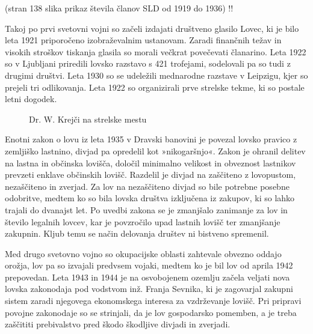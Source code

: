 \documentclass[a4paper,12pt,openright]{book}
\begin{document}
(stran 138 slika prikaz števila članov SLD od 1919 do 1936) !! 

Takoj po prvi svetovni vojni so začeli izdajati društveno glasilo Lovec, ki je bilo leta 1921 priporočeno izobraževalnim ustanovam.
Zaradi finančnih težav in visokih stroškov tiskanja glasila so morali večkrat povečevati članarino.
Leta 1922 so v Ljubljani priredili lovsko razstavo s 421 trofejami, sodelovali pa so tudi z drugimi društvi.
Leta 1930 so se udeležili mednarodne razstave v Leipzigu, kjer so prejeli tri odlikovanja.
Leta 1922 so organizirali prve strelske tekme, ki so postale letni dogodek.\cite{Lov_129_149}

\begin{figure}[h!] 
  \centering
  \caption{Dr. W. Krejči na strelske mestu \cite{bolcina_osebna}}
  \label{fig:dr_w_krejci}
\end{figure}

Enotni zakon o lovu iz leta 1935 v Dravski banovini je povezal lovsko pravico z zemljiško lastnino, divjad pa opredelil kot »nikogaršnjo«. 
Zakon je ohranil delitev na lastna in občinska lovišča, določil minimalno velikost in obveznost lastnikov prevzeti enklave občinskih lovišč. 
Razdelil je divjad na zaščiteno z lovopustom, nezaščiteno in zverjad. 
Za lov na nezaščiteno divjad so bile potrebne posebne odobritve, medtem ko so bila lovska društva izključena iz zakupov, ki so lahko trajali do dvanajst let. \cite{Lov_170_175}
Po uvedbi zakona se je zmanjšalo zanimanje za lov in število legalnih lovcev, kar je povzročilo upad lastnih lovišč ter zmanjšanje zakupnin. 
Kljub temu se način delovanja društev ni bistveno spremenil.\cite{Lov_176_178}

Med drugo svetovno vojno so okupacijske oblasti zahtevale obvezno oddajo orožja, lov pa so izvajali predvsem vojaki, medtem ko je bil lov od aprila 1942 prepovedan. 
Leta 1943 in 1944 je na osvobojenem ozemlju začela veljati nova lovska zakonodaja pod vodstvom inž. Franja Sevnika, ki je zagovarjal zakupni sistem zaradi njegovega ekonomskega interesa za vzdrževanje lovišč. 
Pri pripravi povojne zakonodaje so se strinjali, da je lov gospodarsko pomemben, a je treba zaščititi prebivalstvo pred škodo škodljive divjadi in zverjadi.\cite{Lov_197_201}
\end{document}
